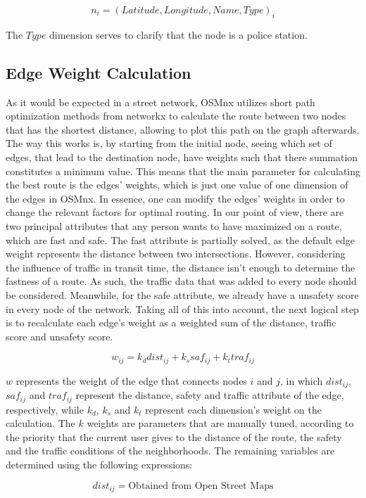 \documentclass[runningheads]{llncs}
\begin{document}
$$n_i = (Latitude, Longitude, Name, Type)_i$$

The $Type$ dimension serves to clarify that the node is a police station.

\subsection{Edge Weight Calculation}

As it would be expected in a street network, OSMnx \cite{geoff_osmnx:_2017} utilizes short path optimization methods from networkx to calculate the route between two nodes that has the shortest distance, allowing to plot this path on the graph afterwards. The way this works is, by starting from the initial node, seeing which set of edges, that lead to the destination node, have weights such that there summation constitutes a minimum value. This means that the main parameter for calculating the best route is the edges' weights, which is just one value of one dimension of the edges in OSMnx. In essence, one can modify the edges' weights in order to change the relevant factors for optimal routing. In our point of view, there are two principal attributes that any person wants to have maximized on a route, which are fast and safe. The fast attribute is partially solved, as the default edge weight represents the distance between two intersections. However, considering the influence of traffic in transit time, the distance isn't enough to determine the fastness of a route. As such, the traffic data that was added to every node should be considered. Meanwhile, for the safe attribute, we already have a unsafety score in every node of the network. Taking all of this into account, the next logical step is to recalculate each edge's weight as a weighted sum of the distance, traffic score and unsafety score. 

$$w_{ij} = k_d dist_{ij} + k_s saf_{ij} + k_t traf_{ij}$$

$w$ represents the weight of the edge that connects nodes $i$ and $j$, in which $dist_{ij}$, $saf_{ij}$ and $traf_{ij}$ represent the distance, safety and traffic attribute of the edge, respectively, while $k_d$, $k_s$ and $k_t$ represent each dimension's weight on the calculation. The $k$ weights are parameters that are manually tuned, according to the priority that the current user gives to the distance of the route, the safety and the traffic conditions of the neighborhoods. The remaining variables are determined using the following expressions:

$$dist_{ij} = \text{Obtained from Open Street Maps}$$
\end{document}
